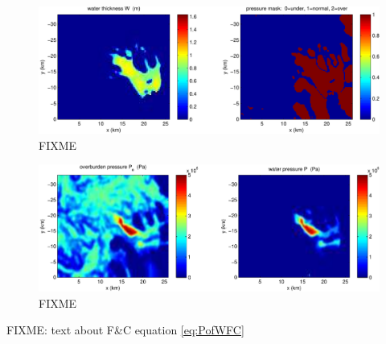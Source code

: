 \documentclass[11pt,final]{amsart}%
\begin{document}
\begin{figure}[ht]
\includegraphics[width=7.0in,keepaspectratio=true]{figs/W-Pmask-250m}
\caption{FIXME}
\end{figure}

\begin{figure}[ht]
\includegraphics[width=7.0in,keepaspectratio=true]{figs/Po-P-250m}
\caption{FIXME}
\end{figure}

FIXME:  text about F\&C equation \eqref{eq:PofWFC}
\end{document}
